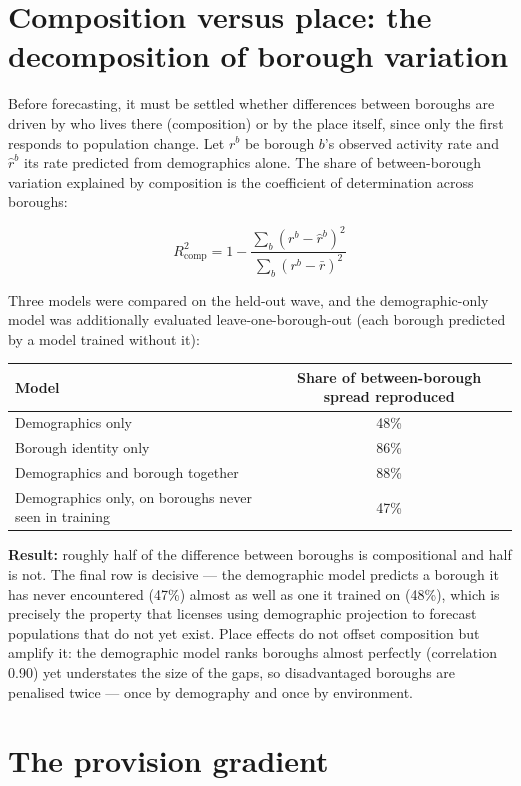 \documentclass[ %
                    author={Ashrey Ashrey, Sanya Kapoor, Trisha Sharma, Yash Bhooshan Pandloskar},
                supervisor={Dr. Dalila O’Grady},
                    degree={MSc},
                     title={Using machine learning to forecast physical activity participation, volunteering and activity patterns in London},
                  subtitle={},
                      type={},
                      year={2021}]{dissertation}
\begin{document}
\section{Composition versus place: the decomposition of borough variation}

\noindent
Before forecasting, it must be settled whether differences between boroughs are driven by who lives there (composition) or by the place itself, since only the first responds to population change. Let \(r^b\) be borough \(b\)'s observed activity rate and \(\hat{r}^b\) its rate predicted from demographics alone. The share of between-borough variation explained by composition is the coefficient of determination across boroughs:

\[
R^2_{\mathrm{comp}}
=
1-
\frac{\sum_b (r^b-\hat{r}^b)^2}
{\sum_b (r^b-\bar{r})^2}
\]

Three models were compared on the held-out wave, and the demographic-only model was additionally evaluated leave-one-borough-out (each borough predicted by a model trained without it):

\begin{table}[!htb]
\centering
\begin{tabularx}{\textwidth}{@{}Xc@{}}
\toprule
\textbf{Model} & \textbf{Share of between-borough spread reproduced} \\
\midrule
Demographics only & 48\% \\
Borough identity only & 86\% \\
Demographics and borough together & 88\% \\
Demographics only, on boroughs never seen in training & 47\% \\
\bottomrule
\end{tabularx}
\end{table}

\noindent
\textbf{Result:} roughly half of the difference between boroughs is compositional and half is not. The final row is decisive --- the demographic model predicts a borough it has never encountered (47\%) almost as well as one it trained on (48\%), which is precisely the property that licenses using demographic projection to forecast populations that do not yet exist. Place effects do not offset composition but amplify it: the demographic model ranks boroughs almost perfectly (correlation 0.90) yet understates the size of the gaps, so disadvantaged boroughs are penalised twice --- once by demography and once by environment.

\section{The provision gradient}
\end{document}
